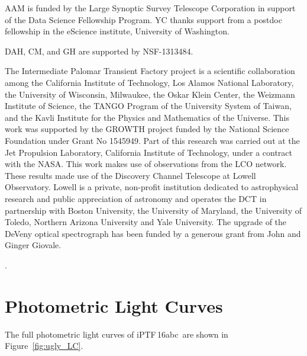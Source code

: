 \documentclass[twocolumn]{aastex61}
\newcommand{\abc}{iPTF\,16abc}
\begin{document}
AAM is funded by the Large Synoptic Survey Telescope Corporation in support of the Data Science Fellowship Program. YC thanks support from a postdoc fellowship in the eScience institute, University of Washington.

DAH, CM, and GH are supported by NSF-1313484.

The Intermediate Palomar Transient Factory project is a scientific collaboration among the California Institute of Technology, Los Alamos National Laboratory, the University of Wisconsin, Milwaukee, the Oskar Klein Center, the Weizmann Institute of Science, the TANGO Program of the University System of Taiwan, and the Kavli Institute for the Physics and Mathematics of the Universe. This work was supported by the GROWTH project funded by the National Science Foundation under Grant No 1545949. Part of this research was carried out at the Jet Propulsion Laboratory, California Institute of Technology, under a contract with the NASA. This work makes use of observations from the LCO network. These results made use of the Discovery Channel Telescope at Lowell Observatory. Lowell is a private, non-profit institution dedicated to astrophysical research and public appreciation of astronomy and operates the DCT in partnership with Boston University, the University of Maryland, the University of Toledo, Northern Arizona University and Yale University.  The upgrade of the DeVeny optical spectrograph has been funded by a generous grant from John and Ginger Giovale.


.


\appendix

\section{Photometric Light Curves}

The full photometric light curves of \abc\ are shown in Figure~\ref{fig:ugly_LC}.
\end{document}
